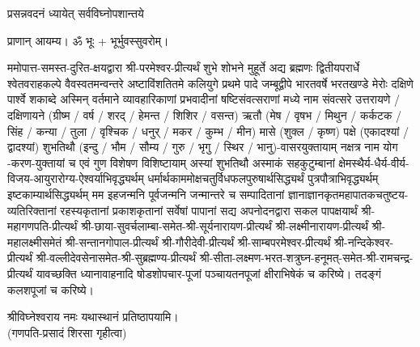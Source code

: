 
% 

{प्रसन्नवदनं ध्यायेत् सर्वविघ्नोपशान्तये}

प्राणान् आयम्य। ॐ भूः + भूर्भुवस्सुवरोम्।


ममोपात्त-समस्त-दुरित-क्षयद्वारा श्री-परमेश्वर-प्रीत्यर्थं शुभे शोभने मुहूर्ते अद्य ब्रह्मणः
द्वितीयपरार्धे श्वेतवराहकल्पे वैवस्वतमन्वन्तरे अष्टाविंशतितमे कलियुगे प्रथमे पादे
जम्बूद्वीपे भारतवर्षे भरतखण्डे मेरोः दक्षिणे पार्श्वे शकाब्दे अस्मिन् वर्तमाने व्यावहारिकाणां
प्रभवादीनां षष्टिसंवत्सराणां मध्ये \blank{} नाम संवत्सरे उत्तरायणे / दक्षिणायने
(ग्रीष्म / वर्ष / शरद् / हेमन्त / शिशिर / वसन्त) ऋतौ (मेष / वृषभ / मिथुन / कर्कटक / सिंह / कन्या / तुला /
वृश्चिक / धनुर् / मकर / कुम्भ / मीन) मासे (शुक्ल / कृष्ण) पक्षे (एकादश्यां / द्वादश्यां) शुभतिथौ
(इन्दु / भौम / सौम्य / गुरु / भृगु / स्थिर / भानु)-वासरयुक्तायाम्
\blank{} नक्षत्र \blank{} नाम योग \blank-करण-युक्तायां च एवं गुण विशेषण विशिष्टायाम्
अस्यां \blank{} शुभतिथौ
अस्माकं सहकुटुम्बानां क्षेमस्थैर्य-धैर्य-वीर्य-विजय-आयुरारोग्य-ऐश्वर्याभिवृद्ध्यर्थम्
धर्मार्थकाममोक्ष\-चतुर्विधफलपुरुषार्थसिद्ध्यर्थं पुत्रपौत्राभि\-वृद्ध्यर्थम् इष्टकाम्यार्थसिद्ध्यर्थम्
मम इहजन्मनि पूर्वजन्मनि जन्मान्तरे च सम्पादितानां ज्ञानाज्ञानकृतमहा\-पातकचतुष्टय-व्यतिरिक्तानां रहस्यकृतानां प्रकाशकृतानां सर्वेषां पापानां सद्य अपनोदनद्वारा सकल पापक्षयार्थं
श्री-महागणपति-प्रीत्यर्थं श्री-छाया-सुवर्चलाम्बा-समेत-श्री-सूर्यनारायण-प्रीत्यर्थं श्री-लक्ष्मीनारायण-प्रीत्यर्थं
श्री-महालक्ष्मीसमेतं श्री-सन्तानगोपाल-प्रीत्यर्थं श्री-गौरीदेवी-प्रीत्यर्थं श्री-साम्बपरमेश्वर-प्रीत्यर्थं श्री-नन्दिकेश्वर-प्रीत्यर्थं
श्री-वल्लीदेवसेनासमेत-श्री-सुब्रह्मण्य-प्रीत्यर्थं श्री-सीता-लक्ष्मण-भरत-शत्रुघ्न-हनूमत्-समेत-श्री-रामचन्द्र-प्रीत्यर्थं
यावच्छक्ति ध्यानावाहनादि षोडशोपचार-पूजां पञ्चायतनपूजां क्षीराभिषेकं च करिष्ये। तदङ्गं कलशपूजां च करिष्ये।

श्रीविघ्नेश्वराय नमः यथास्थानं प्रतिष्ठापयामि।\\
(गणपति-प्रसादं शिरसा गृहीत्वा)









